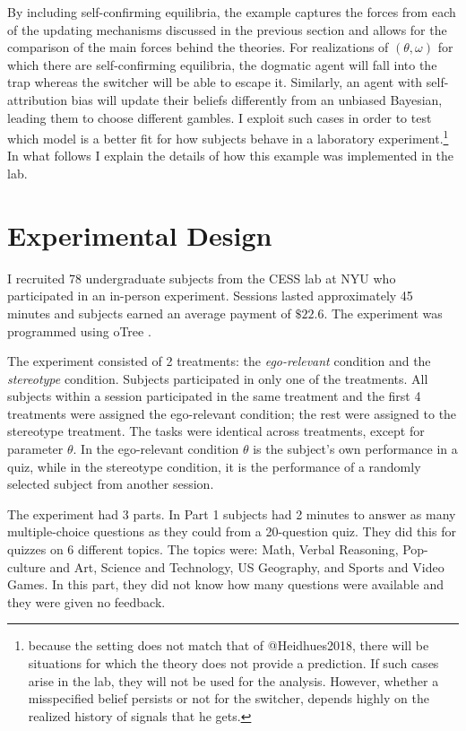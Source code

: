 \documentclass[
  12pt,
]{article}
\begin{document}
By including self-confirming equilibria, the example captures the forces
from each of the updating mechanisms discussed in the previous section
and allows for the comparison of the main forces behind the theories.
For realizations of \((\theta, \omega)\) for which there are
self-confirming equilibria, the dogmatic agent will fall into the trap
whereas the switcher will be able to escape it. Similarly, an agent with
self-attribution bias will update their beliefs differently from an
unbiased Bayesian, leading them to choose different gambles. I exploit
such cases in order to test which model is a better fit for how subjects
behave in a laboratory
experiment.\footnote{because the setting does not match that of @Heidhues2018, there will be situations for which the theory 
does not provide a prediction. If such cases arise in the lab, they will not be used for the analysis. However, whether a misspecified 
belief persists or not for the switcher, depends highly on the realized history of signals that he gets.}
In what follows I explain the details of how this example was
implemented in the lab.

\hypertarget{experimental-design}{%
\section{Experimental Design}\label{experimental-design}}

I recruited 78 undergraduate subjects from the CESS lab at NYU who
participated in an in-person experiment. Sessions lasted approximately
45 minutes and subjects earned an average payment of \(\$22.6\). The
experiment was programmed using oTree \citep{otree}.

The experiment consisted of 2 treatments: the \emph{ego-relevant}
condition and the \emph{stereotype} condition. Subjects participated in
only one of the treatments. All subjects within a session participated
in the same treatment and the first 4 treatments were assigned the
ego-relevant condition; the rest were assigned to the stereotype
treatment. The tasks were identical across treatments, except for
parameter \(\theta\). In the ego-relevant condition \(\theta\) is the
subject's own performance in a quiz, while in the stereotype condition,
it is the performance of a randomly selected subject from another
session.

The experiment had 3 parts. In Part 1 subjects had 2 minutes to answer
as many multiple-choice questions as they could from a 20-question quiz.
They did this for quizzes on 6 different topics. The topics were: Math,
Verbal Reasoning, Pop-culture and Art, Science and Technology, US
Geography, and Sports and Video Games. In this part, they did not know
how many questions were available and they were given no feedback.
\end{document}

